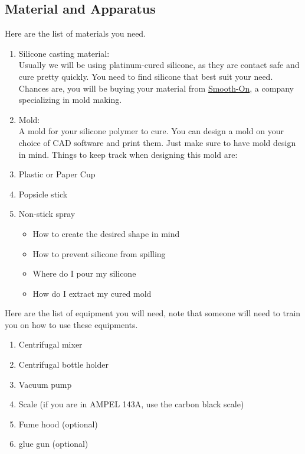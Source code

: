 \documentclass{article}
\begin{document}
\subsection{Material and Apparatus}
Here are the list of materials you need.
\begin{enumerate}
    \item Silicone casting material:\\
        Usually we will be using platinum-cured silicone, as they are contact safe and cure pretty quickly. You need to find silicone that best suit your need. Chances are, you will be buying your material from \href{https://www.smooth-on.com/}{Smooth-On}, a company specializing in mold making.
    \item Mold: \\
        A mold for your silicone polymer to cure. You can design a mold on your choice of CAD software and print them. Just make sure to have mold design in mind. Things to keep track when designing this mold are:
    \item Plastic or Paper Cup
    \item Popsicle stick
    \item Non-stick spray
        \begin{itemize}
            \item How to create the desired shape in mind
            \item How to prevent silicone from spilling
            \item Where do I pour my silicone
            \item How do I extract my cured mold
        \end{itemize}
\end{enumerate}
Here are the list of equipment you will need, note that someone will need to train you on how to use these equipments.
\begin{enumerate}
    \item Centrifugal mixer
    \item Centrifugal bottle holder
    \item Vacuum pump
    \item Scale (if you are in AMPEL 143A, use the carbon black scale)
    \item Fume hood (optional)
    \item glue gun (optional)
\end{enumerate}
\end{document}

